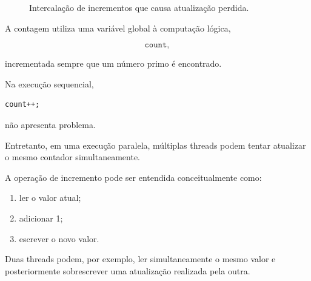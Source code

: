 \begin{figure}[htbp]
    \centering
    \caption{Intercalação de incrementos que causa atualização perdida.}
    \label{fig:atvd05-corrida}
\end{figure}

A contagem utiliza uma variável global à computação lógica,

\[
\texttt{count},
\]

incrementada sempre que um número primo é encontrado.

Na execução sequencial,

\begin{verbatim}
count++;
\end{verbatim}

não apresenta problema.

Entretanto, em uma execução paralela, múltiplas threads podem tentar
atualizar o mesmo contador simultaneamente.

A operação de incremento pode ser entendida conceitualmente como:

\begin{enumerate}
    \item ler o valor atual;
    \item adicionar 1;
    \item escrever o novo valor.
\end{enumerate}

Duas threads podem, por exemplo, ler simultaneamente o mesmo valor e
posteriormente sobrescrever uma atualização realizada pela outra.

